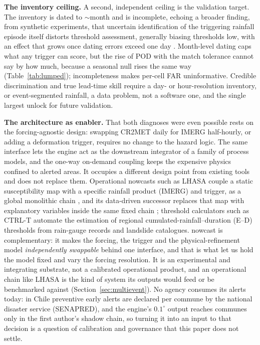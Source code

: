 \documentclass[authoryear,preprint,review,12pt]{elsarticle}
\begin{document}
\textbf{The inventory ceiling.} A second, independent ceiling is the validation
target. The inventory is dated to $\sim$month and is incomplete, echoing a
broader finding, from synthetic experiments, that uncertain identification of the
triggering rainfall episode itself distorts threshold assessment, generally biasing
thresholds low, with an effect that grows once dating errors exceed one day
\citep{peres2018}. Month-level
dating caps what any trigger can score, but the rise of POD with the match
tolerance cannot say by how much, because a seasonal null rises the same way
(Table~\ref{tab:lumped}); incompleteness makes per-cell FAR uninformative.
Credible discrimination and true lead-time skill require a day- or hour-resolution
inventory, or event-segmented rainfall, a data problem, not a software one, and
the single largest unlock for future validation.

\textbf{The architecture as enabler.} That both diagnoses were even possible rests
on the forcing-agnostic design: swapping CR2MET daily for IMERG half-hourly, or
adding a deformation trigger, requires no change to the hazard logic. The same
interface lets the engine act as the downstream integrator of a family of process
models, and the one-way on-demand coupling keeps the expensive physics confined to
alerted areas. It occupies a different design point from existing tools and does not replace them. Operational nowcasts such as LHASA couple a static susceptibility map with a
specific rainfall product (IMERG) and trigger, as a global monolithic chain
\citep{kirschbaum2018}, and its data-driven successor replaces that map with
explanatory variables inside the same fixed chain \citep{stanley2021}; threshold
calculators such as CTRL-T \citep{melillo2018} automate the estimation of regional
cumulated-rainfall--duration (E--D) thresholds from rain-gauge records and
landslide catalogues.
nowcast is complementary: it makes the forcing, the trigger and the
physical-refinement model \emph{independently swappable} behind one interface, and that is what let us hold the model fixed and vary the forcing resolution. It is
an experimental and integrating substrate, not a calibrated operational product, and
an operational chain like LHASA is the kind of system its outputs would feed or be
benchmarked against (Section~\ref{sec:multievent}). No agency consumes its alerts today:
in Chile preventive early alerts are declared per commune by the national disaster
service (SENAPRED), and the engine's $0.1^{\circ}$ output reaches communes only in the
first author's shadow chain, so turning it into an input to that decision is a question of
calibration and governance that this paper does not settle.
\end{document}
